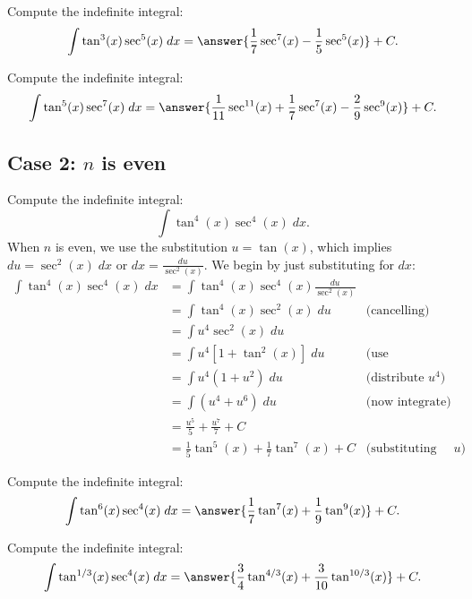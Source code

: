 \documentclass{ximera}
\begin{document}
\begin{problem}
Compute the indefinite integral:
\[
\int \tan^3(x) \sec^5(x)\;dx = \answer{\frac17 \sec^7(x) - \frac15 \sec^5(x)} + C.
\]
\end{problem}

\begin{problem}
Compute the indefinite integral:
\[
\int \tan^5(x) \sec^7(x)\;dx = \answer{\frac{1}{11} \sec^{11}(x) + \frac17 \sec^7(x) -\frac29 \sec^9(x)} + C.
\]
\end{problem}



\subsection{Case 2: $n$ is even}
\begin{example}
Compute the indefinite integral:
\[
\int \tan^4(x) \sec^4(x)\;dx.
\]
When $n$ is even, we use the substitution $u = \tan(x)$,
which implies $du = \sec^2(x) \; dx$ or $dx = \frac{du}{\sec^2(x)}$.
We begin by just substituting for $dx$:
\begin{align*}
\int \tan^4(x) \sec^4(x)\;dx &= \int \tan^4(x) \sec^4(x) \frac{du}{\sec^2(x)}\\
&= \int \tan^4(x) \sec^2(x) \; du & \text{(cancelling)}\\
&= \int u^4 \sec^2(x) \; du \\
&= \int u^4\left[1 + \tan^2(x)\right] \; du & \text{(use Pythagorean identity)}\\
&= \int u^4(1+u^2) \; du & \text{(distribute $u^4$)}\\
&= \int (u^4 + u^6) \; du & \text{(now integrate)}\\
&=  \frac{u^5}{5} + \frac{u^7}{7} + C  \\
&= \frac15\tan^5(x)  + \frac17 \tan^7(x) + C & \text{(substituting for $u$)}
\end{align*}
\end{example}

\begin{problem}
Compute the indefinite integral:
\[
\int \tan^6(x) \sec^4(x)\;dx = \answer{\frac17 \tan^7(x) + \frac19 \tan^9(x)} + C.
\]
\end{problem}

\begin{problem}
Compute the indefinite integral:
\[
\int \tan^{1/3}(x) \sec^4(x)\;dx = \answer{\frac34 \tan^{4/3}(x) + \frac{3}{10} \tan^{10/3}(x)} + C.
\]
\end{problem}
\end{document}
